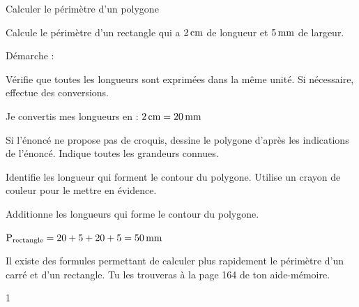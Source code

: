 \documentclass[a4paper,11pt]{report}
\let\oldcenter\center
\let\oldendcenter\endcenter
\renewenvironment{center}{\setlength\topsep{-10pt}\oldcenter}{\oldendcenter}
\begin{document}
\begin{resolu}{Calculer le périmètre d'un polygone}{
		Calcule le périmètre d'un rectangle qui a $\tunit{2}{cm}$ de longueur et $\tunit{5}{mm}$ de largeur.

Démarche :
\begin{tasks}
    \task Vérifie que toutes les longueurs sont exprimées dans la même unité. Si nécessaire, effectue des conversions.
    
    {\color{blue} Je convertis mes longueurs en  : $\tunit{2}{cm}=\tunit{20}{mm}$}
    
    \task Si l'énoncé ne propose pas de croquis, dessine le polygone d'après les indications de l'énoncé. Indique toutes les grandeurs connues. 
    \begin{center}
    \end{center}
    \vspace{-0.8cm}
    \task Identifie les longueur qui forment le contour du polygone. Utilise un crayon de couleur pour le mettre en évidence.
    \begin{center} 
    \end{center}
    \vspace{-0.8cm}
    \task Additionne les longueurs qui forme le contour du polygone.
    
    {\color{blue} $\textrm{P}_{\textrm{rectangle}}=20+5+20+5=\tunit{50}{mm}$}
\end{tasks}
\bigskip
{\color{red} \faExclamationTriangle} Il existe des formules permettant de calculer plus rapidement le périmètre d'un carré et d'un rectangle. Tu les trouveras à la page 164 de ton aide-mémoire.

}{1}
\end{resolu}
\end{document}
